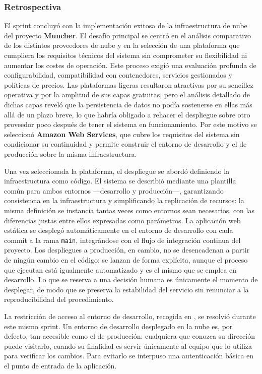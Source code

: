 \subsubsection*{Retrospectiva}

El sprint concluyó con la implementación exitosa de la infraestructura de nube
del proyecto \textbf{Muncher}. El desafío principal se centró en el análisis
comparativo de los distintos proveedores de nube y en la selección de una
plataforma que cumpliera los requisitos técnicos del sistema sin comprometer su
flexibilidad ni aumentar los costes de operación. Este proceso exigió una
evaluación profunda de configurabilidad, compatibilidad con contenedores,
servicios gestionados y políticas de precios. Las plataformas ligeras
resultaron atractivas por su sencillez operativa y por la amplitud de sus capas
gratuitas, pero el análisis detallado de dichas capas reveló que la persistencia
de datos no podía sostenerse en ellas más allá de un plazo breve, lo que
habría obligado a rehacer el despliegue sobre otro proveedor poco después de
tener el sistema en funcionamiento. Por este motivo se seleccionó
\textbf{Amazon Web Services}, que cubre los requisitos del sistema sin
condicionar su continuidad y permite construir el entorno de desarrollo y el de
producción sobre la misma infraestructura.

Una vez seleccionada la plataforma, el despliegue se abordó definiendo la
infraestructura como código. El sistema se describió mediante una plantilla
común para ambos entornos —desarrollo y producción—, garantizando consistencia
en la infraestructura y simplificando la replicación de recursos: la misma
definición se instancia tantas veces como entornos sean necesarios, con las
diferencias justas entre ellos expresadas como parámetros. La aplicación web
estática se desplegó automáticamente en el entorno de desarrollo con cada
commit a la rama \texttt{main}, integrándose con el flujo de integración
continua del proyecto. Los despliegues a producción, en cambio, no se
desencadenan a partir de ningún cambio en el código: se lanzan de forma
explícita, aunque el proceso que ejecutan está igualmente automatizado y es el
mismo que se emplea en desarrollo. Lo que se reserva a una decisión humana es
únicamente el momento de desplegar, de modo que se preserva la estabilidad del
servicio sin renunciar a la reproducibilidad del procedimiento.

La restricción de acceso al entorno de desarrollo, recogida en
, se resolvió durante este mismo sprint. Un entorno de
desarrollo desplegado en la nube es, por defecto, tan accesible como el de
producción: cualquiera que conozca su dirección puede visitarlo, cuando su
finalidad es servir únicamente al equipo que lo utiliza para verificar los
cambios. Para evitarlo se interpuso una autenticación básica en el punto de
entrada de la aplicación.

